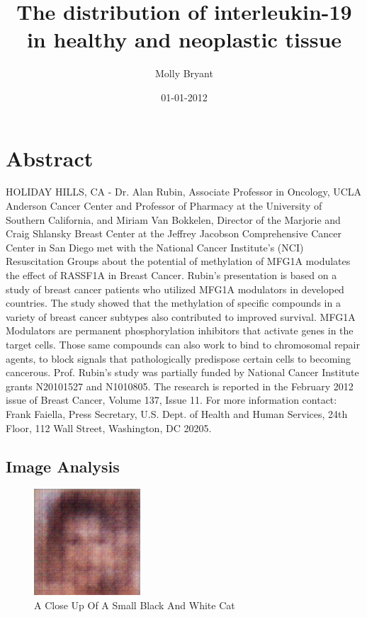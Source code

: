 \documentclass{article}%
\title{The distribution of interleukin{-}19 in healthy and neoplastic tissue}%
\author{Molly Bryant}%
\affil{University of Glasgow School of Medicine, Institute of Medical Genetics, Yorkhill Hospital, Glasgow, United Kingdom}%
\date{01{-}01{-}2012}%
\begin{document}
%
\normalsize%
\maketitle%
\section{Abstract}%
\label{sec:Abstract}%
HOLIDAY HILLS, CA {-} Dr. Alan Rubin, Associate Professor in Oncology, UCLA Anderson Cancer Center and Professor of Pharmacy at the University of Southern California, and Miriam Van Bokkelen, Director of the Marjorie and Craig Shlansky Breast Center at the Jeffrey Jacobson Comprehensive Cancer Center in San Diego met with the National Cancer Institute's (NCI) Resuscitation Groups about the potential of methylation of MFG1A modulates the effect of RASSF1A in Breast Cancer.\newline%
Rubin's presentation is based on a study of breast cancer patients who utilized MFG1A modulators in developed countries. The study showed that the methylation of specific compounds in a variety of breast cancer subtypes also contributed to improved survival. MFG1A Modulators are permanent phosphorylation inhibitors that activate genes in the target cells. Those same compounds can also work to bind to chromosomal repair agents, to block signals that pathologically predispose certain cells to becoming cancerous.\newline%
Prof. Rubin's study was partially funded by National Cancer Institute grants N20101527 and N1010805.\newline%
The research is reported in the February 2012 issue of Breast Cancer, Volume 137, Issue 11.\newline%
For more information contact:\newline%
Frank Faiella, Press Secretary, U.S. Dept. of Health and Human Services, 24th Floor, 112 Wall Street, Washington, DC 20205.

%
\subsection{Image Analysis}%
\label{subsec:ImageAnalysis}%


\begin{figure}[h!]%
\centering%
\includegraphics[width=150px]{500_fake_images/samples_5_275.png}%
\caption{A Close Up Of A Small Black And White Cat}%
\end{figure}

%
\end{document}
